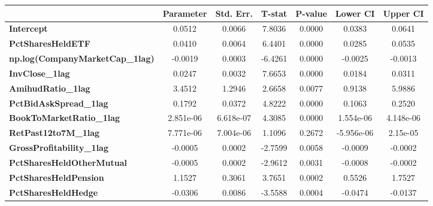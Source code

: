 \begin{center}
\begin{tabular}{lclc}
\bottomrule
\end{tabular}
\begin{tabular}{lcccccc}
                                        & \textbf{Parameter} & \textbf{Std. Err.} & \textbf{T-stat} & \textbf{P-value} & \textbf{Lower CI} & \textbf{Upper CI}  \\
\midrule
\textbf{Intercept}                      &       0.0512       &       0.0066       &      7.8036     &      0.0000      &       0.0383      &       0.0641       \\
\textbf{PctSharesHeldETF}               &       0.0410       &       0.0064       &      6.4401     &      0.0000      &       0.0285      &       0.0535       \\
\textbf{np.log(CompanyMarketCap\_1lag)} &      -0.0019       &       0.0003       &     -6.4261     &      0.0000      &      -0.0025      &      -0.0013       \\
\textbf{InvClose\_1lag}                 &       0.0247       &       0.0032       &      7.6653     &      0.0000      &       0.0184      &       0.0311       \\
\textbf{AmihudRatio\_1lag}              &       3.4512       &       1.2946       &      2.6658     &      0.0077      &       0.9138      &       5.9886       \\
\textbf{PctBidAskSpread\_1lag}          &       0.1792       &       0.0372       &      4.8222     &      0.0000      &       0.1063      &       0.2520       \\
\textbf{BookToMarketRatio\_1lag}        &     2.851e-06      &     6.618e-07      &      4.3085     &      0.0000      &     1.554e-06     &     4.148e-06      \\
\textbf{RetPast12to7M\_1lag}            &     7.771e-06      &     7.004e-06      &      1.1096     &      0.2672      &     -5.956e-06    &      2.15e-05      \\
\textbf{GrossProfitability\_1lag}       &      -0.0005       &       0.0002       &     -2.7599     &      0.0058      &      -0.0009      &      -0.0002       \\
\textbf{PctSharesHeldOtherMutual}       &      -0.0005       &       0.0002       &     -2.9612     &      0.0031      &      -0.0008      &      -0.0002       \\
\textbf{PctSharesHeldPension}           &       1.1527       &       0.3061       &      3.7651     &      0.0002      &       0.5526      &       1.7527       \\
\textbf{PctSharesHeldHedge}             &      -0.0306       &       0.0086       &     -3.5588     &      0.0004      &      -0.0474      &      -0.0137       \\

\end{tabular}
\end{center}
